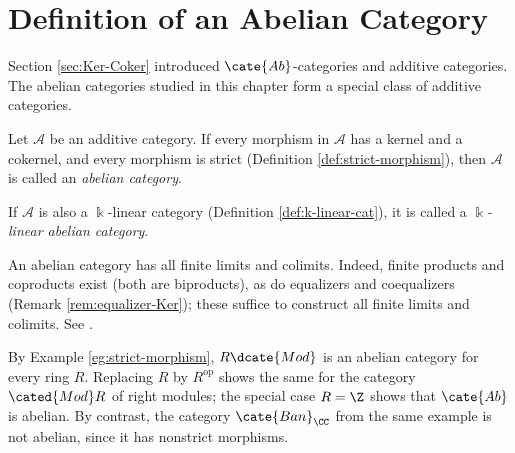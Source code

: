 
\section{Definition of an Abelian Category}\label{sec:Abel-cat-def}
\hypertarget{o014.aljabr2.chapter2.abelian-category-definition}{ }

Section \ref{sec:Ker-Coker} introduced $\cate{Ab}$-categories and additive
categories. The abelian categories studied in this chapter form a special
class of additive categories.

\begin{definition}
	Let $\mathcal{A}$ be an additive category. If every morphism in
	$\mathcal{A}$ has a kernel and a cokernel, and every morphism is strict
	(Definition \ref{def:strict-morphism}), then $\mathcal{A}$ is called an
	\emph{abelian category}.

	If $\mathcal{A}$ is also a $\Bbbk$-linear category (Definition
	\ref{def:k-linear-cat}), it is called a \emph{$\Bbbk$-linear abelian
	category}.
\end{definition}

\begin{remark}\label{rem:Abel-cat-finite-lim}
	An abelian category has all finite limits and colimits. Indeed, finite
	products and coproducts exist (both are biproducts), as do equalizers and
	coequalizers (Remark \ref{rem:equalizer-Ker}); these suffice to construct
	all finite limits and colimits. See \cite[Theorem 2.8.3]{Li1}.
\end{remark}

By Example \ref{eg:strict-morphism}, $R\dcate{Mod}$ is an abelian category for
every ring $R$. Replacing $R$ by $R^{\text{op}}$ shows the same for the
category $\cated{Mod}R$ of right modules; the special case $R=\Z$ shows that
$\cate{Ab}$ is abelian. By contrast, the category $\cate{Ban}_{\CC}$ from the
same example is not abelian, since it has nonstrict morphisms.

